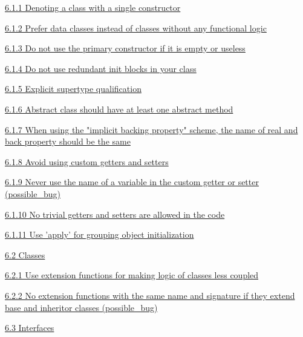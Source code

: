 \hspace{1.0cm}\hyperref[sec:6.1.1]{ 6.1.1 Denoting a class with a single constructor}

\hspace{1.0cm}\hyperref[sec:6.1.2]{ 6.1.2 Prefer data classes instead of classes without any functional logic}

\hspace{1.0cm}\hyperref[sec:6.1.3]{ 6.1.3 Do not use the primary constructor if it is empty or useless}

\hspace{1.0cm}\hyperref[sec:6.1.4]{ 6.1.4 Do not use redundant init blocks in your class}

\hspace{1.0cm}\hyperref[sec:6.1.5]{ 6.1.5 Explicit supertype qualification}

\hspace{1.0cm}\hyperref[sec:6.1.6]{ 6.1.6 Abstract class should have at least one abstract method}

\hspace{1.0cm}\hyperref[sec:6.1.7]{ 6.1.7 When using the "implicit backing property" scheme, the name of real and back property should be the same}

\hspace{1.0cm}\hyperref[sec:6.1.8]{ 6.1.8 Avoid using custom getters and setters}

\hspace{1.0cm}\hyperref[sec:6.1.9]{ 6.1.9 Never use the name of a variable in the custom getter or setter (possible\_bug)}

\hspace{1.0cm}\hyperref[sec:6.1.10]{ 6.1.10 No trivial getters and setters are allowed in the code}

\hspace{1.0cm}\hyperref[sec:6.1.11]{ 6.1.11 Use 'apply' for grouping object initialization}

\hspace{0.5cm}\hyperref[sec:6.2]{ 6.2 Classes}

\hspace{1.0cm}\hyperref[sec:6.2.1]{ 6.2.1 Use extension functions for making logic of classes less coupled}

\hspace{1.0cm}\hyperref[sec:6.2.2]{ 6.2.2 No extension functions with the same name and signature if they extend base and inheritor classes (possible\_bug)}

\hspace{0.5cm}\hyperref[sec:6.3]{ 6.3 Interfaces}

